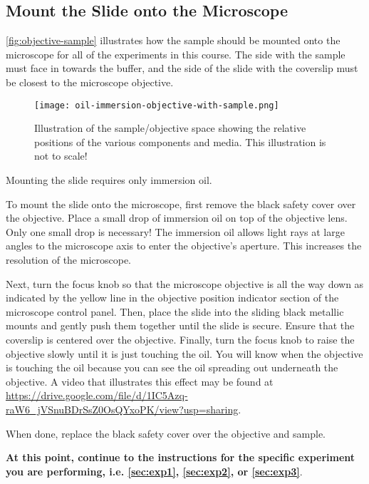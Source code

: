 \documentclass[10pt,a4paper,oneside]{book}
\begin{document}
\subsection{Mount the Slide onto the Microscope}\label{sec:mount-slide}

\autoref{fig:objective-sample} illustrates how the sample should be mounted onto the microscope for all of the experiments in this course. The side with the sample must face in towards the buffer, and the side of the slide with the coverslip must be closest to the microscope objective.

\begin{figure}[ht]
    \centering
    \texttt{[image: oil-immersion-objective-with-sample.png]}
    \caption{Illustration of the sample/objective space showing the relative positions of the various components and media. This illustration is not to scale!}
    \label{fig:objective-sample}
\end{figure}

Mounting the slide requires only immersion oil.

To mount the slide onto the microscope, first remove the black safety cover over the objective. Place a small drop of immersion oil on top of the objective lens. Only one small drop is necessary! The immersion oil allows light rays at large angles to the microscope axis to enter the objective's aperture. This increases the resolution of the microscope.

Next, turn the focus knob so that the microscope objective is all the way down as indicated by the yellow line in the objective position indicator section of the microscope control panel. Then, place the slide into the sliding black metallic mounts and gently push them together until the slide is secure. Ensure that the coverslip is centered over the objective. Finally, turn the focus knob to raise the objective slowly until it is just touching the oil. You will know when the objective is touching the oil because you can see the oil spreading out underneath the objective. A video that illustrates this effect may be found at \url{https://drive.google.com/file/d/1IC5Azq-raW6_jVSnuBDrSsZ0OsQYxoPK/view?usp=sharing}.

When done, replace the black safety cover over the objective and sample.

\textbf{At this point, continue to the instructions for the specific experiment you are performing, i.e. \autoref{sec:exp1}, \autoref{sec:exp2}, or \autoref{sec:exp3}}.
\end{document}
